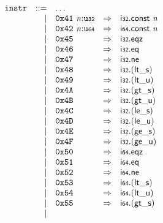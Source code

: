 $$
\begin{array}{@{}l@{}rrlll@{}l@{}}
& {\mathtt{instr}} &::=& \dots \\ &&|&
\mathtt{0x41}~{\mathit{n}}{:}{\mathtt{u{\scriptstyle32}}} &\Rightarrow& \mathsf{i{\scriptstyle32}}.\mathsf{const}~{\mathit{n}} \\ &&|&
\mathtt{0x42}~{\mathit{n}}{:}{\mathtt{u{\scriptstyle64}}} &\Rightarrow& \mathsf{i{\scriptstyle64}}.\mathsf{const}~{\mathit{n}} \\ &&|&
\mathtt{0x45} &\Rightarrow& \mathsf{i{\scriptstyle32}} . \mathsf{eqz} \\ &&|&
\mathtt{0x46} &\Rightarrow& \mathsf{i{\scriptstyle32}} . \mathsf{eq} \\ &&|&
\mathtt{0x47} &\Rightarrow& \mathsf{i{\scriptstyle32}} . \mathsf{ne} \\ &&|&
\mathtt{0x48} &\Rightarrow& \mathsf{i{\scriptstyle32}} . ({\mathsf{lt\_}}{\mathsf{s}}) \\ &&|&
\mathtt{0x49} &\Rightarrow& \mathsf{i{\scriptstyle32}} . ({\mathsf{lt\_}}{\mathsf{u}}) \\ &&|&
\mathtt{0x4A} &\Rightarrow& \mathsf{i{\scriptstyle32}} . ({\mathsf{gt\_}}{\mathsf{s}}) \\ &&|&
\mathtt{0x4B} &\Rightarrow& \mathsf{i{\scriptstyle32}} . ({\mathsf{gt\_}}{\mathsf{u}}) \\ &&|&
\mathtt{0x4C} &\Rightarrow& \mathsf{i{\scriptstyle32}} . ({\mathsf{le\_}}{\mathsf{s}}) \\ &&|&
\mathtt{0x4D} &\Rightarrow& \mathsf{i{\scriptstyle32}} . ({\mathsf{le\_}}{\mathsf{u}}) \\ &&|&
\mathtt{0x4E} &\Rightarrow& \mathsf{i{\scriptstyle32}} . ({\mathsf{ge\_}}{\mathsf{s}}) \\ &&|&
\mathtt{0x4F} &\Rightarrow& \mathsf{i{\scriptstyle32}} . ({\mathsf{ge\_}}{\mathsf{u}}) \\ &&|&
\mathtt{0x50} &\Rightarrow& \mathsf{i{\scriptstyle64}} . \mathsf{eqz} \\ &&|&
\mathtt{0x51} &\Rightarrow& \mathsf{i{\scriptstyle64}} . \mathsf{eq} \\ &&|&
\mathtt{0x52} &\Rightarrow& \mathsf{i{\scriptstyle64}} . \mathsf{ne} \\ &&|&
\mathtt{0x53} &\Rightarrow& \mathsf{i{\scriptstyle64}} . ({\mathsf{lt\_}}{\mathsf{s}}) \\ &&|&
\mathtt{0x54} &\Rightarrow& \mathsf{i{\scriptstyle64}} . ({\mathsf{lt\_}}{\mathsf{u}}) \\ &&|&
\mathtt{0x55} &\Rightarrow& \mathsf{i{\scriptstyle64}} . ({\mathsf{gt\_}}{\mathsf{s}}) \\ &&|&

\end{array}$$
